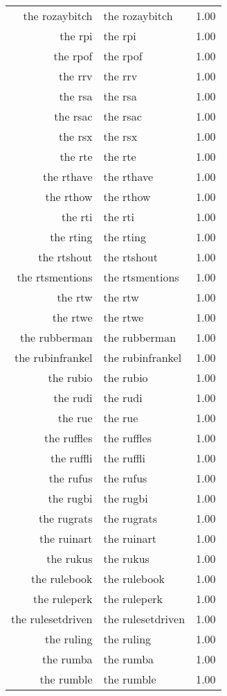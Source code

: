 \begin{table}[ht]
\begin{tabular}{rlr}
  the rozaybitch & the rozaybitch & 1.00 \\ 
  the rpi & the rpi & 1.00 \\ 
  the rpof & the rpof & 1.00 \\ 
  the rrv & the rrv & 1.00 \\ 
  the rsa & the rsa & 1.00 \\ 
  the rsac & the rsac & 1.00 \\ 
  the rsx & the rsx & 1.00 \\ 
  the rte & the rte & 1.00 \\ 
  the rthave & the rthave & 1.00 \\ 
  the rthow & the rthow & 1.00 \\ 
  the rti & the rti & 1.00 \\ 
  the rting & the rting & 1.00 \\ 
  the rtshout & the rtshout & 1.00 \\ 
  the rtsmentions & the rtsmentions & 1.00 \\ 
  the rtw & the rtw & 1.00 \\ 
  the rtwe & the rtwe & 1.00 \\ 
  the rubberman & the rubberman & 1.00 \\ 
  the rubinfrankel & the rubinfrankel & 1.00 \\ 
  the rubio & the rubio & 1.00 \\ 
  the rudi & the rudi & 1.00 \\ 
  the rue & the rue & 1.00 \\ 
  the ruffles & the ruffles & 1.00 \\ 
  the ruffli & the ruffli & 1.00 \\ 
  the rufus & the rufus & 1.00 \\ 
  the rugbi & the rugbi & 1.00 \\ 
  the rugrats & the rugrats & 1.00 \\ 
  the ruinart & the ruinart & 1.00 \\ 
  the rukus & the rukus & 1.00 \\ 
  the rulebook & the rulebook & 1.00 \\ 
  the ruleperk & the ruleperk & 1.00 \\ 
  the rulesetdriven & the rulesetdriven & 1.00 \\ 
  the ruling & the ruling & 1.00 \\ 
  the rumba & the rumba & 1.00 \\ 
  the rumble & the rumble & 1.00 \\ 

\end{tabular}
\end{table}
